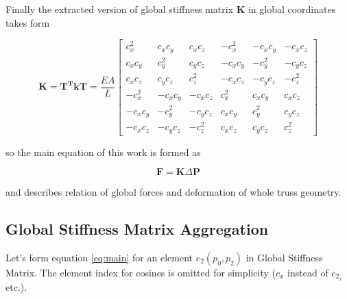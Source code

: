 Finally the extracted version of global stiffness matrix $\mathbf{K}$ in global coordinates takes form

\begin{equation}
\mathbf{K} = \mathbf{T^T k T} = \frac {EA} L
\begin{bmatrix}
	c^2_x & c_xc_y & c_xc_z & -c^2_x & -c_xc_y & -c_xc_z \\
	c_xc_y & c^2_y & c_yc_z & -c_xc_y & -c^2_y & -c_yc_z \\
	c_xc_z & c_yc_z & c^2_z & -c_xc_z & -c_yc_z & -c^2_z \\
	-c^2_x & -c_xc_y & -c_xc_z & c^2_x & c_xc_y & c_xc_z \\
	-c_xc_y & -c^2_y & -c_yc_z & c_xc_y & c^2_y & c_yc_z \\
	-c_xc_z & -c_yc_z & -c^2_z & c_xc_z & c_yc_z & c^2_z
\end{bmatrix}
\end{equation}

so the main equation of this work is formed as

\begin{equation}
\mathbf{F} = \mathbf{K} \Delta \mathbf{P}
\label{eq:main}
\end{equation}

and describes relation of global forces and deformation of whole truss geometry.

\subsection{Global Stiffness Matrix Aggregation}

Let's form equation \ref{eq:main} for an element $e_2(p_0,p_2)$ in Global Stiffness Matrix. The element index for cosines is omitted for simplicity ($c_x$ instead of $c_{2_x}$ etc.).

